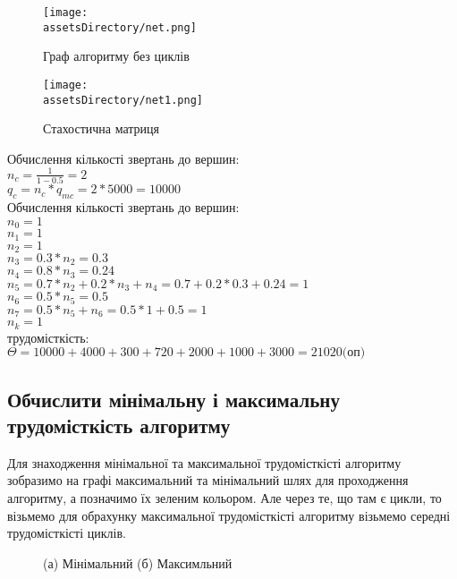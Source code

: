 \begin{figure}[ht!]
    \centering
    \texttt{[image: \\assetsDirectory/net.png]}
    \caption{Граф алгоритму без циклів}
\end{figure}

\newpage
\begin{figure}[ht!]
    \centering
    \texttt{[image: \\assetsDirectory/net1.png]}
    \caption{Стахостична матриця}
\end{figure}

\noindent
Обчислення кількості звертань до вершин:\\
$n_c = \frac{1}{1 - 0.5} = 2$\\
$q_c = n_c * q_{mc} = 2 * 5000 = 10000$\\

\noindent
Обчислення кількості звертань до вершин:\\
$n_0 = 1$\\
$n_1 = 1$\\
$n_2 = 1$\\
$n_3 = 0.3 * n_2 = 0.3$\\
$n_4 = 0.8 * n_3 = 0.24$\\
$n_5 = 0.7 * n_2 + 0.2 * n_3 + n_4 = 0.7 + 0.2 * 0.3 + 0.24 = 1$\\
$n_6 = 0.5 * n_5 = 0.5$\\
$n_7 = 0.5 * n_5 + n_6 = 0.5 *1 + 0.5 = 1$\\
$n_k = 1$\\

\noindent
трудомісткість:\\
$\Theta = 10000 + 4000 + 300 + 720 + 2000 + 1000 + 3000 = 21020 \text{(оп)}$\\


\newpage
\subsection{Обчислити мінімальну і максимальну трудомісткість алгоритму}

Для знаходження мінімальної та максимальної трудомісткісті алгоритму зобразимо на графі
максимальний та мінімальний шлях для проходження алгоритму, а позначимо їх зеленим кольором.
Але через те, що там є цикли,
то візьмемо для обрахунку максимальної трудомісткісті алгоритму візьмемо середні трудомісткісті циклів.

\begin{figure}[ht!]
    \centering
    \caption{(а) Мінімальний (б) Максимльний}
\end{figure}

